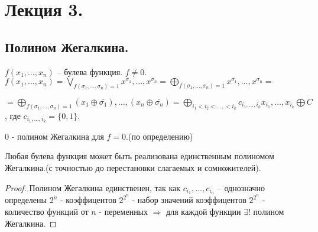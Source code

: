 
\section{Лекция 3.}
\subsection{Полином Жегалкина.} 
$f(x_1, \ldots, x_n)$ -- булева функция. $f\neq 0$. \\
$f(x_1, \ldots, x_n)=\bigvee \limits_{f(\sigma_1, \ldots, \sigma_n)=1} x^{\sigma_1}, \ldots, x^{\sigma_n}=\bigoplus \limits_{f(\sigma_1, \ldots, \sigma_n)=1} x^{\sigma_1}, \ldots, x^{\sigma_n}=$ 
\begin{flushright}
$
=\bigoplus \limits_{f(\sigma_1, \ldots, \sigma_n)=1} (x_1\oplus \bar{\sigma_1}),\ldots,(x_n\oplus \bar{\sigma_n})=\bigoplus \limits_{i_1<i_2< \ldots,<i_k} c_{i_1, \ldots, i_k}x_{i_1}, \ldots ,x_{i_k} \bigoplus C $, где  $c_{i_1, \ldots, i_k}=\{0,1\}$.
\end{flushright} 
$0$ - полином Жегалкина для $f=0$.(по определению) 

\begin{statement}
	Любая булева функция может быть реализована единственным полиномом Жегалкина.(с точностью до перестановки слагаемых и сомножителей). 
\end{statement}
\begin{proof}
	Полином Жегалкина единственен, так как $c_{i_1}, \ldots, c_{i_n}$ -- однозначно определены $2^n$ -  коэффицентов $2^{2^n}$ - набор значений коэффицентов $2^{2^n}$ - количество функций от $n$ - переменных $\Rightarrow$ для каждой функции $\exists !$ полином Жегалкина. 
\end{proof}
